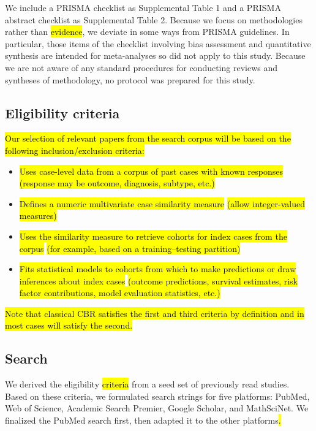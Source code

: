 \documentclass[sn-mathphys,Numbered,pdflatex]{sn-jnl}
\theoremstyle{remark}
\theoremstyle{definition}
\providecommand{\tightlist}{%
  \setlength{\itemsep}{0pt}\setlength{\parskip}{0pt}}
\begin{document}
We include a PRISMA checklist as Supplemental Table 1 and a PRISMA
abstract checklist as Supplemental Table 2. Because we focus on
methodologies rather than\hl{ evidence}, we deviate in some ways from
PRISMA guidelines. In particular, those items of the checklist involving
bias assessment and quantitative synthesis are intended for
meta-analyses so did not apply to this study. Because we are not aware
of any standard procedures for conducting reviews and syntheses of
methodology, no protocol was prepared for this study.

\subsection{Eligibility criteria}\label{eligibility-criteria}

\hl{Our selection of relevant papers from the search corpus will be based on the following inclusion/exclusion criteria:}

\begin{itemize}
\tightlist
\item
  \hl{Uses case-level data from a corpus of past cases with known responses}\newline
  \hl{(response may be outcome, diagnosis, subtype, etc.)}
\item
  \hl{Defines a numeric multivariate case similarity measure}\newline
  \hl{(allow integer-valued measures)}
\item
  \hl{Uses the similarity measure to retrieve cohorts for index cases from the corpus}\newline
  \hl{(for example, based on a training--testing partition)}
\item
  \hl{Fits statistical models to cohorts from which to make predictions or draw inferences about index cases}\newline
  \hl{(outcome predictions, survival estimates, risk factor contributions, model evaluation statistics, etc.)}
\end{itemize}

\hl{Note that classical CBR satisfies the first and third criteria by definition and in most cases will satisfy the second.}

\subsection{Search}\label{search}

We derived the eligibility \hl{criteria }from a seed set of previously
read studies. Based on these criteria, we formulated search strings for
five platforms: PubMed, Web of Science, Academic Search Premier, Google
Scholar, and MathSciNet. We finalized the PubMed search first, then
adapted it to the other platforms\hl{.}
\end{document}
